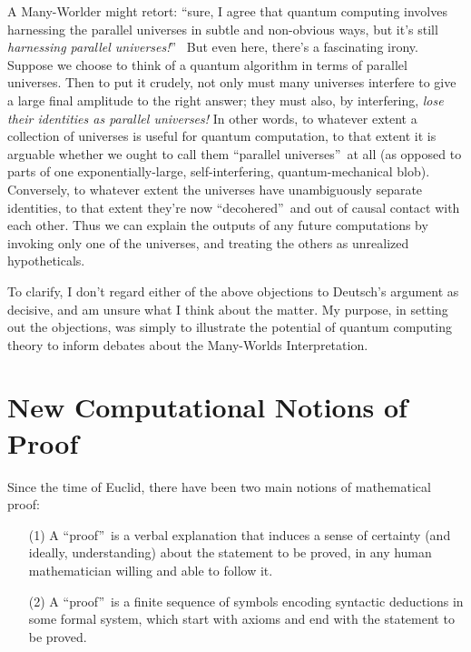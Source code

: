 \documentclass[12pt,onecolumn]{article}%
\begin{document}
A Many-Worlder might retort: \textquotedblleft sure, I agree that quantum
computing involves harnessing the parallel universes in subtle and non-obvious
ways, but it's still \textit{harnessing parallel universes!}\textquotedblright\ %
 But even here, there's a fascinating irony. Suppose we choose to think
of a quantum algorithm in terms of parallel universes. Then to put it
crudely, not only must many universes interfere to give a large final
amplitude to the right answer; they must also, by interfering, \textit{lose
their identities as parallel universes!} In other words, to whatever extent
a collection of universes is useful for quantum computation, to that extent it
is arguable whether we ought to call them \textquotedblleft parallel
universes\textquotedblright\  at all (as opposed to parts of one
exponentially-large, self-interfering, quantum-mechanical blob). Conversely,
to whatever extent the universes have unambiguously separate identities, to
that extent they're now \textquotedblleft decohered\textquotedblright\  and out
of causal contact with each other. Thus we can explain the outputs of any
future computations by invoking only one of the universes, and treating the
others as unrealized hypotheticals.

To clarify, I don't regard either of the above objections to Deutsch's
argument as decisive, and am unsure what I think about the matter. My
purpose, in setting out the objections, was simply to illustrate the potential
of quantum computing theory to inform debates about the Many-Worlds Interpretation.

\section{New Computational Notions of Proof\label{PROOF}}

Since the time of Euclid, there have been two main notions of mathematical proof:

\begin{enumerate}
\item[(1)] A \textquotedblleft proof\textquotedblright\  is a verbal
explanation that induces a sense of certainty (and ideally, understanding)
about the statement to be proved, in any human mathematician willing and able
to follow it.

\item[(2)] A \textquotedblleft proof\textquotedblright\  is a finite sequence
of symbols encoding syntactic deductions in some formal system, which start
with axioms and end with the statement to be proved.
\end{enumerate}
\end{document}
